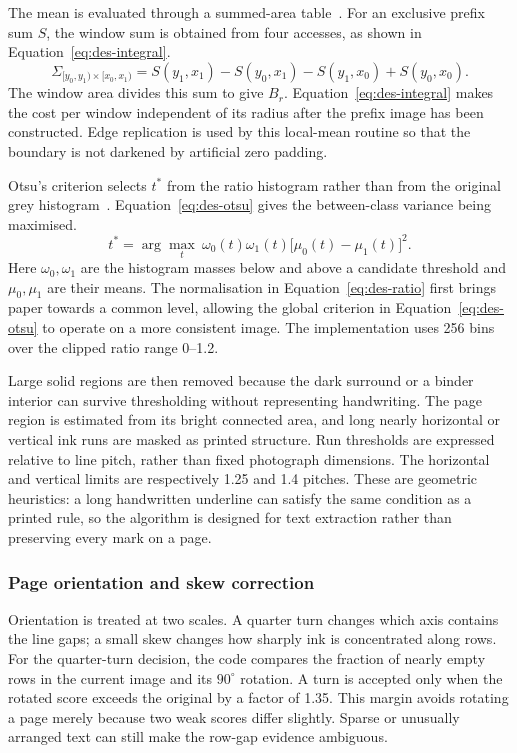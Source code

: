 The mean is evaluated through a summed-area table~\cite{crow1984}. For an exclusive prefix sum $S$, the window sum is obtained from four accesses, as shown in Equation~\ref{eq:des-integral}.
\begin{equation}
\Sigma_{[y_0,y_1)\times[x_0,x_1)}=
S(y_1,x_1)-S(y_0,x_1)-S(y_1,x_0)+S(y_0,x_0).
\label{eq:des-integral}
\end{equation}
The window area divides this sum to give $B_r$. Equation~\ref{eq:des-integral} makes the cost per window independent of its radius after the prefix image has been constructed. Edge replication is used by this local-mean routine so that the boundary is not darkened by artificial zero padding.

Otsu's criterion selects $t^*$ from the ratio histogram rather than from the original grey histogram~\cite{otsu1979}. Equation~\ref{eq:des-otsu} gives the between-class variance being maximised.
\begin{equation}
t^*=\arg\max_t\ \omega_0(t)\omega_1(t)
\bigl[\mu_0(t)-\mu_1(t)\bigr]^2.
\label{eq:des-otsu}
\end{equation}
Here $\omega_0,\omega_1$ are the histogram masses below and above a candidate threshold and $\mu_0,\mu_1$ are their means. The normalisation in Equation~\ref{eq:des-ratio} first brings paper towards a common level, allowing the global criterion in Equation~\ref{eq:des-otsu} to operate on a more consistent image. The implementation uses 256 bins over the clipped ratio range 0--1.2.

Large solid regions are then removed because the dark surround or a binder interior can survive thresholding without representing handwriting. The page region is estimated from its bright connected area, and long nearly horizontal or vertical ink runs are masked as printed structure. Run thresholds are expressed relative to line pitch, rather than fixed photograph dimensions. The horizontal and vertical limits are respectively 1.25 and 1.4 pitches. These are geometric heuristics: a long handwritten underline can satisfy the same condition as a printed rule, so the algorithm is designed for text extraction rather than preserving every mark on a page.

\subsubsection{Page orientation and skew correction}
Orientation is treated at two scales. A quarter turn changes which axis contains the line gaps; a small skew changes how sharply ink is concentrated along rows. For the quarter-turn decision, the code compares the fraction of nearly empty rows in the current image and its $90^\circ$ rotation. A turn is accepted only when the rotated score exceeds the original by a factor of 1.35. This margin avoids rotating a page merely because two weak scores differ slightly. Sparse or unusually arranged text can still make the row-gap evidence ambiguous.

